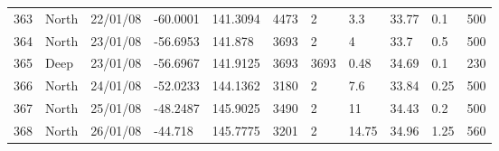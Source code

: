\begin{sidewaystable}
\begin{tabularx}{\textheight}{lllllXXXllX}
363 & North & 22/01/08 & -60.0001 & 141.3094 & 4473 & 2 & 3.3 & 33.77 & 0.1 & 500\\
364 & North & 23/01/08 & -56.6953 & 141.878 & 3693 & 2 & 4 & 33.7 & 0.5 & 500\\
365 & Deep & 23/01/08 & -56.6967 & 141.9125 & 3693 & 3693 & 0.48 & 34.69 & 0.1 & 230\\
366 & North & 24/01/08 & -52.0233 & 144.1362 & 3180 & 2 & 7.6 & 33.84 & 0.25 & 500\\
367 & North & 25/01/08 & -48.2487 & 145.9025 & 3490 & 2 & 11 & 34.43 & 0.2 & 500\\
368 & North & 26/01/08 & -44.718 & 145.7775 & 3201 & 2 & 14.75 & 34.96 & 1.25 & 560\\
\bottomrule
\end{tabularx}
\end{sidewaystable}
